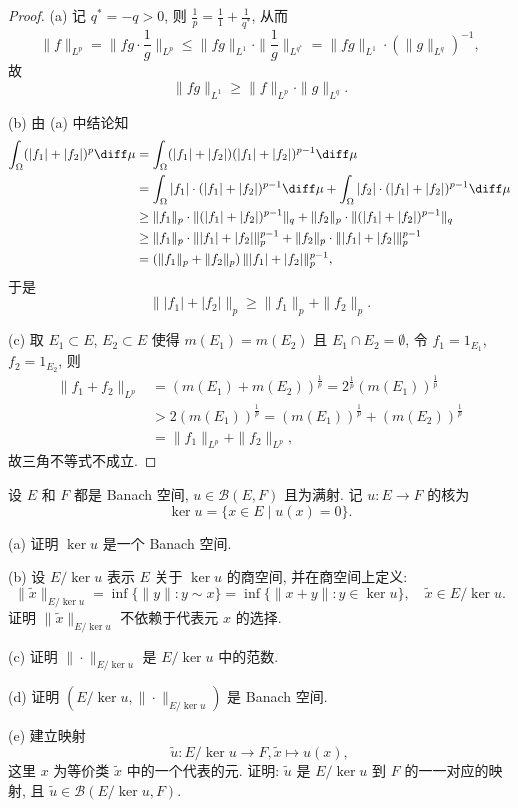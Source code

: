 \documentclass{mathexercise}
\begin{document}
\begin{proof}
    (a) 记 $q^*=-q>0$, 则 $\frac{1}{p}=\frac{1}{1}+\frac{1}{q^*}$, 从而
    \[\|f\|_{L^p}=\|fg\cdot\frac{1}{g}\|_{L^p}\leq\|fg\|_{L^1}\cdot\|\frac{1}{g}\|_{L^{q^*}}=\|fg\|_{L^1}\cdot\left(\|g\|_{L^q}\right)^{-1},\]
    故
    \[\|fg\|_{L^1}\geq \|f\|_{L^p}\cdot\|g\|_{L^q}.\]

    (b) 由 (a) 中结论知
    \begin{align*}
        \int_{\Omega}(|f_1|+|f_2|)^p\diff\mu
        &=\int_{\Omega}(|f_1|+|f_2|)(|f_1|+|f_2|)^{p-1}\diff\mu \\
        &=\int_{\Omega}|f_1|\cdot (|f_1|+|f_2|)^{p-1}\diff\mu+\int_{\Omega}|f_2|\cdot (|f_1|+|f_2|)^{p-1}\diff\mu \\
        &\geq\|f_1\|_p\cdot\|(|f_1|+|f_2|)^{p-1}\|_q+\|f_2\|_p\cdot\|(|f_1|+|f_2|)^{p-1}\|_q \\
        &\geq\|f_1\|_p\cdot\||f_1|+|f_2|\|_p^{p-1}+\|f_2\|_p\cdot\||f_1|+|f_2|\|_p^{p-1} \\
        &=\left(\|f_1\|_p+\|f_2\|_p\right)\||f_1|+|f_2|\|_p^{p-1},
    \end{align*}
    于是
    \[\||f_1|+|f_2|\|_p\geq \|f_1\|_p+\|f_2\|_p.\]

    (c) 取 $E_1\subset E$, $E_2\subset E$ 使得 $m(E_1)=m(E_2)$ 且 $E_1\cap E_2=\emptyset$,
    令 $f_1=1_{E_1}$, $f_2=1_{E_2}$, 则
    \begin{align*}
        \|f_1+f_2\|_{L^p}
        &=(m(E_1)+m(E_2))^{\frac{1}{p}}=2^{\frac{1}{p}}(m(E_1))^{\frac{1}{p}} \\
        &>2(m(E_1))^{\frac{1}{p}}=(m(E_1))^{\frac{1}{p}}+(m(E_2))^{\frac{1}{p}} \\
        &=\|f_1\|_{L^p}+\|f_2\|_{L^p},
    \end{align*}
    故三角不等式不成立.
\end{proof}



\begin{exercise}
    设 $E$ 和 $F$ 都是 Banach 空间, $u\in\mathcal{B}(E,F)$ 且为满射.
    记 $u:E\to F$ 的核为
    \[\ker u=\{x\in E\mid u(x)=0\}.\]

    (a) 证明 $\ker u$ 是一个 Banach 空间.

    (b) 设 $E/\ker u$ 表示 $E$ 关于 $\ker u$ 的商空间, 并在商空间上定义:
    \[\|\tilde{x}\|_{E/\ker u}=\inf\{\|y\|\colon y\sim x\}=\inf\{\|x+y\|\colon y\in\ker u\},\quad\tilde{x}\in E/\ker u.\]
    证明 $\|\tilde{x}\|_{E/\ker u}$ 不依赖于代表元 $x$ 的选择.

    (c) 证明 $\|\cdot\|_{E/\ker u}$ 是 $E/\ker u$ 中的范数.

    (d) 证明 $(E/\ker u,\|\cdot\|_{E/\ker u})$ 是 Banach 空间.

    (e) 建立映射
    \[\tilde{u}:E/\ker u\to F, \tilde{x}\mapsto u(x),\]
    这里 $x$ 为等价类 $\tilde{x}$ 中的一个代表的元.
    证明: $\tilde{u}$ 是 $E/\ker u$ 到 $F$ 的一一对应的映射,
    且 $\tilde{u}\in\mathcal{B}(E/\ker u,F)$.
\end{exercise}
\end{document}
